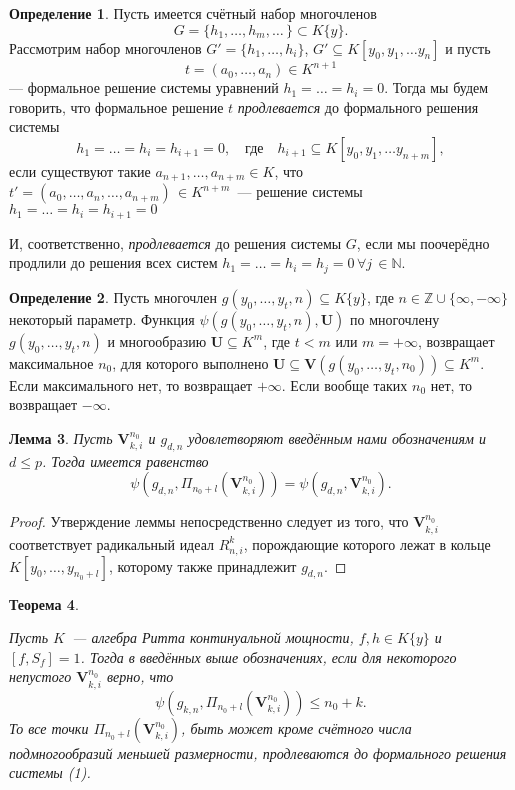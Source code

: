 \documentclass[16pt]{article}
\theoremstyle{plain}
\newtheorem{theorem}{Теорема}
\newtheorem{lemma}[theorem]{Лемма}
\theoremstyle{definition}
\newtheorem{definition}[theorem]{Определение}
\theoremstyle{remark}
\begin{document}
\begin{definition}
Пусть имеется счётный набор многочленов
$$
G=\{h_1,\ldots,h_m,\ldots\,\}\subset K\{y\}.
$$
Рассмотрим набор многочленов $G'=\{h_1,\ldots,h_i\}$, $G'\subseteq K[y_0,y_1,\ldots
y_n]$ и пусть
$$
t=(a_0,\ldots,a_n)\in K^{n+1}
$$
--- формальное решение системы уравнений $h_1=\ldots=h_i=0$. Тогда мы будем говорить, что формальное решение
$t$ \emph{продлевается} до формального решения системы
$$
h_1=\ldots=h_i=h_{i+1}=0, \quad\mbox{где}\quad h_{i+1}\subseteq K[y_0,y_1,\ldots
y_{n+m}],
$$
если существуют такие $a_{n+1},\ldots, a_{n+m}\in K$, что
$t'=(a_0,\ldots,a_n,\ldots,a_{n+m})\,\in K^{n+m}$~--- решение
системы $h_1=\ldots=h_i=h_{i+1}=0$

И, соответственно, \emph{продлевается} до решения системы $G$, если
мы поочерёдно продлили до решения всех систем $h_1=\ldots=h_i=h_{j}=0\, \forall j\,\in \mathbb{N}$.
\end{definition}



\begin{definition}
Пусть многочлен $g(y_0,\ldots,y_t,n)\subseteq K\{y\}$, где $n\in \mathbb{Z}\cup\{\infty,-\infty\}$ некоторый параметр. Функция $\psi(g(y_0,\ldots,y_t,n),\mathbf{U})$ по многочлену $g(y_0,\ldots,y_t,n)$ и  многообразию $\mathbf{U}\subseteq K^m$, где $t< m$ или $m=+\infty$, возвращает максимальное $n_0$, для которого выполнено $\mathbf{U}\subseteq \mathbf{V}(g(y_0,\ldots,y_t,n_0))\subseteq K^m$. Если максимального нет, то возвращает $+\infty$. Если вообще таких  $n_0$ нет, то возвращает $-\infty$.
\end{definition}

\begin{lemma}\label{lemma:o_ravenste_psi}
Пусть $\mathbf{V}_{k,i}^{n_0}$ и $g_{d,n}$ удовлетворяют введённым нами обозначениям и  $d\leqslant p$. Тогда имеется равенство $$\psi(g_{d,n},\Pi_{n_0+l}(\mathbf{V}_{k,i}^{n_0}))=\psi(g_{d,n},\mathbf{V}_{k,i}^{n_0}).$$
\end{lemma}

\begin{proof}
Утверждение леммы непосредственно следует из того, что $\mathbf{V}_{k,i}^{n_0}$ соответствует радикальный идеал $R_{n,i}^k$, порождающие которого лежат в кольце $K[y_0,\ldots,y_{n_0+l}]$, которому также принадлежит $g_{d,n}$.
\end{proof}


\begin{theorem}\label{theorem:general th1}

Пусть $K$~--- алгебра Ритта континуальной мощности, $f,h\in K\{y\}$ и $[f,S_f]=1$. Тогда в введённых выше обозначениях, если для некоторого непустого $\mathbf{V}_{k,i}^{n_0}$ верно, что
\begin{equation}
\psi(g_{k,n},\Pi_{n_0+l}(\mathbf{V}_{k,i}^{n_0}))\leqslant n_0+k.
\end{equation}
То все точки $\Pi_{n_0+l}(\mathbf{V}_{k,i}^{n_0})$, быть может кроме счётного числа подмногообразий меньшей размерности, продлеваются до формального решения системы (1).
\end{theorem}
\end{document}
